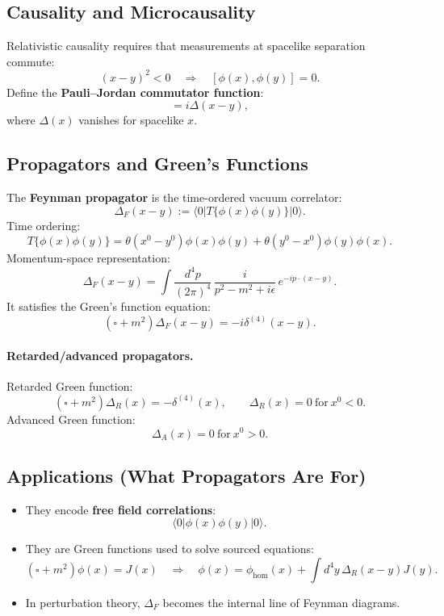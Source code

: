 \subsection{Causality and Microcausality}
Relativistic causality requires that measurements at spacelike separation commute:
\begin{equation}
(x-y)^2<0
\quad\Rightarrow\quad
[\phi(x),\phi(y)]=0.
\end{equation}
Define the \textbf{Pauli--Jordan commutator function}:
\begin{equation}
[\phi(x),\phi(y)] = i\Delta(x-y),
\end{equation}
where $\Delta(x)$ vanishes for spacelike $x$.

\subsection{Propagators and Green's Functions}
The \textbf{Feynman propagator} is the time-ordered vacuum correlator:
\begin{equation}
\Delta_F(x-y)
:=\langle 0|T\{\phi(x)\phi(y)\}|0\rangle.
\end{equation}
Time ordering:
\begin{equation}
T\{\phi(x)\phi(y)\}=
\theta(x^0-y^0)\phi(x)\phi(y)+\theta(y^0-x^0)\phi(y)\phi(x).
\end{equation}
Momentum-space representation:
\begin{equation}
\Delta_F(x-y)
=
\int\frac{d^4p}{(2\pi)^4}\,
\frac{i}{p^2-m^2+i\epsilon}\,e^{-ip\cdot(x-y)}.
\end{equation}
It satisfies the Green's function equation:
\begin{equation}
(\square+m^2)\Delta_F(x-y)=-i\delta^{(4)}(x-y).
\end{equation}

\paragraph{Retarded/advanced propagators.}
Retarded Green function:
\begin{equation}
(\square+m^2)\Delta_R(x)=-\delta^{(4)}(x),
\qquad
\Delta_R(x)=0\ \text{for}\ x^0<0.
\end{equation}
Advanced Green function:
\begin{equation}
\Delta_A(x)=0\ \text{for}\ x^0>0.
\end{equation}

\subsection{Applications (What Propagators Are For)}
\begin{itemize}
\item They encode \textbf{free field correlations}:
\[
\langle 0|\phi(x)\phi(y)|0\rangle.
\]
\item They are Green functions used to solve sourced equations:
\[
(\square+m^2)\phi(x)=J(x)
\quad\Rightarrow\quad
\phi(x)=\phi_{\mathrm{hom}}(x)+\int d^4y\,\Delta_R(x-y)J(y).
\]
\item In perturbation theory, $\Delta_F$ becomes the internal line of Feynman diagrams.
\end{itemize}


